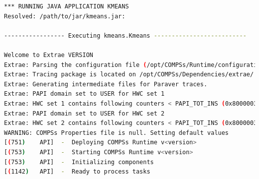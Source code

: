 \begin{lstlisting}[language=bash]
*** RUNNING JAVA APPLICATION KMEANS
Resolved: /path/to/jar/kmeans.jar:

----------------- Executing kmeans.Kmeans --------------------------

Welcome to Extrae VERSION 
Extrae: Parsing the configuration file (/opt/COMPSs/Runtime/configuration/xml/tracing/extrae_basic.xml) begins
Extrae: Tracing package is located on /opt/COMPSs/Dependencies/extrae/
Extrae: Generating intermediate files for Paraver traces.
Extrae: PAPI domain set to USER for HWC set 1
Extrae: HWC set 1 contains following counters < PAPI_TOT_INS (0x80000032) PAPI_TOT_CYC (0x8000003b) PAPI_LD_INS (0x80000035) PAPI_SR_INS (0x80000036) > - changing every 500000000 nanoseconds
Extrae: PAPI domain set to USER for HWC set 2
Extrae: HWC set 2 contains following counters < PAPI_TOT_INS (0x80000032) PAPI_TOT_CYC (0x8000003b) PAPI_LD_INS (0x80000035) PAPI_SR_INS (0x80000036) PAPI_L2_DCM (0x80000002) > - changing every 500000000 nanoseconds
WARNING: COMPSs Properties file is null. Setting default values
[(751)    API]  -  Deploying COMPSs Runtime v<version>
[(753)    API]  -  Starting COMPSs Runtime v<version>
[(753)    API]  -  Initializing components
[(1142)   API]  -  Ready to process tasks


\end{lstlisting}
